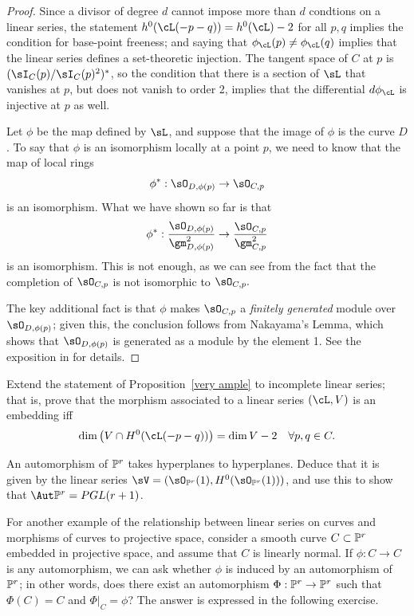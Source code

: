 \begin{proof}
Since a divisor of degree $d$ cannot impose more than $d$ condtions on a linear series, the statement $h^0(\cL(-p-q)) = h^0(\cL) - 2$ for all $p, q$ implies the condition for base-point freeness; and saying that $\phi_\cL(p) \neq \phi_\cL(q)$ implies that the linear series defines a set-theoretic injection. The tangent space of $C$ at $p$ is $(\sI_C(p)/\sI_C(p)^2)^*$, so the condition that there is a section of $\sL$ that vanishes at $p$, but does not vanish
to order 2, implies that the differential $d\phi_\cL$ is injective at $p$ as well.

Let $\phi$ be the map defined by $\sL$, and suppose that the image of $\phi$ is the curve $D$. To say that $\phi$  is an isomorphism locally at a point $p$, we need to know that the map of local rings
$$
\phi^*: \sO_{D,\phi(p)} \to \sO_{C,p}
$$
is an isomorphism. What we have shown so far is that 
$$
\phi^*: \frac{\sO_{D,\phi(p)}}{\gm_{D,\phi(p)}^2} \to \frac{\sO_{C,p}}{\gm_{C,p}^2}
$$
is an isomorphism. This is not enough, as we can see from the fact that the completion of $\sO_{C,p}$ is not
isomorphic to $\sO_{C,p}.$

The key additional fact is that $\phi$ makes $\sO_{C,p}$  a \emph{finitely generated} module over 
$\sO_{D,\phi(p)}$;
given this, the conclusion follows from Nakayama's Lemma, which shows that
$\sO_{D,\phi(p)}$ is generated as a module by the element 1.
See the exposition in \cite[Proposition 7.3 and Lemma 7.4]{H} for details.
\end{proof}


\begin{exercise}
Extend the statement of Proposition~\ref{very ample} to incomplete linear series; that is, prove that the morphism associated to a linear series $(\cL, V)$ is an embedding iff
$$
\dim\big( V \cap H^0(\cL(-p-q))\big) = \dim V - 2 \quad \forall p, q \in C.
$$
\end{exercise}

\begin{exercise}
An automorphism of $\PP^r$ takes hyperplanes to hyperplanes. Deduce that it is given by the linear series
$\sV = (\sO_{\PP^r}(1), H^0(\sO_{\PP^r}(1)))$, and use this to show that $\Aut \PP^r = PGL(r+1)$. 
\end{exercise}

For another example of the relationship between linear series on curves and morphisms of curves to projective space, consider a smooth curve $C \subset \PP^r$ embedded in projective space, and assume that $C$ is linearly normal. If $\phi : C \to C$ is any automorphism, we can ask whether $\phi$ is induced by an automorphism of $\PP^r$; in other words, does there exist an automorphism $\Phi : \PP^r \to \PP^r$ such that $\Phi(C) = C$ and $\Phi|_C = \phi$? The answer is expressed in the following exercise.

